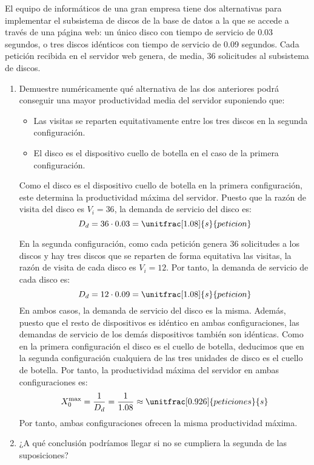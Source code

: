 \begin{ejercicio}\label{ej:5.15}
    El equipo de informáticos de una gran empresa tiene dos alternativas para implementar el subsistema de discos de la base de datos a la que se accede a través de una página web: un único disco con tiempo de servicio de 0.03 segundos, o tres discos idénticos con tiempo de servicio de 0.09 segundos. Cada petición recibida en el servidor web genera, de media, 36 solicitudes al subsistema de discos.
    \begin{enumerate}
        \item Demuestre numéricamente qué alternativa de las dos anteriores podrá conseguir una mayor productividad media del servidor suponiendo que:
        \begin{itemize}
            \item Las visitas se reparten equitativamente entre los tres discos en la segunda configuración.
            \item El disco es el dispositivo cuello de botella en el caso de la primera configuración.
        \end{itemize}


        Como el disco es el dispositivo cuello de botella en la primera configuración, este determina la productividad máxima del servidor. Puesto que la razón de visita del disco es $V_i=36$, la demanda de servicio del disco es:
        \begin{equation*}
            D_d = 36 \cdot 0.03 = \unitfrac[1.08]{s}{peticion}
        \end{equation*}

        En la segunda configuración, como cada petición genera 36 solicitudes a los discos y hay tres discos que se reparten de forma equitativa las visitas, la razón de visita de cada disco es $V_i=12$. Por tanto, la demanda de servicio de cada disco es:
        \begin{equation*}
            D_d = 12 \cdot 0.09 = \unitfrac[1.08]{s}{peticion}
        \end{equation*}
        En ambos casos, la demanda de servicio del disco es la misma. Además, puesto que el resto de dispositivos es idéntico en ambas configuraciones, las demandas de servicio de los demás dispositivos también son idénticas. Como en la primera configuración el disco es el cuello de botella, deducimos que en la segunda configuración cualquiera de las tres unidades de disco es el cuello de botella. Por tanto, la productividad máxima del servidor en ambas configuraciones es:
        \begin{equation*}
            X_0^{\text{max}} = \dfrac{1}{D_d} = \dfrac{1}{1.08} \approx \unitfrac[0.926]{peticiones}{s}
        \end{equation*}
        Por tanto, ambas configuraciones ofrecen la misma productividad máxima.
        \item ¿A qué conclusión podríamos llegar si no se cumpliera la segunda de las suposiciones?
        

\end{enumerate}
\end{ejercicio}
